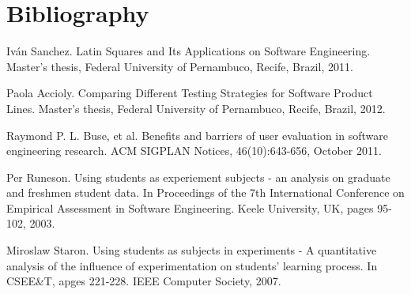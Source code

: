 \chapter{Bibliography}

\begin{thebibliography}{4}

 Iván Sanchez. Latin Squares and Its Applications on Software Engineering. Master's thesis, Federal University of Pernambuco, Recife, Brazil, 2011.

 Paola Accioly. Comparing Different Testing Strategies for Software Product Lines. Master's thesis, Federal University of Pernambuco, Recife, Brazil, 2012.

 Raymond P. L. Buse, et al. Benefits and barriers of user evaluation in software engineering research. ACM SIGPLAN Notices, 46(10):643-656, October 2011.

 Per Runeson. Using students as experiement subjects - an analysis on graduate and freshmen student data. In Proceedings of the 7th International Conference on Empirical Assessment in Software Engineering. Keele University, UK, pages 95-102, 2003.

 Miroslaw Staron. Using students as subjects in experiments - A quantitative analysis of the influence of experimentation on students' learning process. In CSEE&T, apges 221-228. IEEE Computer Society, 2007.

\end{thebibliography}